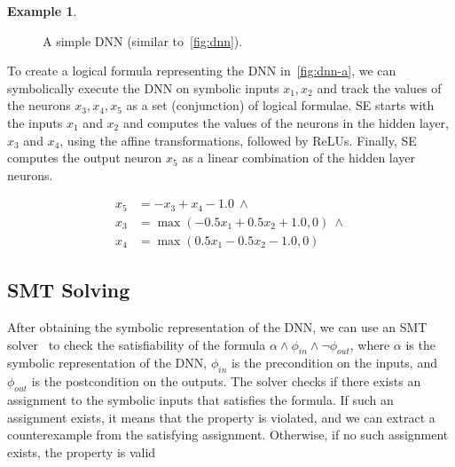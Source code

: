 \documentclass[oneside,11pt,dvipsnames]{book}
\numberwithin{equation}{section}
\theoremstyle{definition}
\newtheorem{example}{Example}[section]
\theoremstyle{remark}
\begin{document}
\begin{example}\label{ex:se-dnn}
\begin{figure}
\centering
{}
\caption{\label{fig:dnn-a}A simple DNN (similar to~\autoref{fig:dnn}).}
\end{figure}    

To create a logical formula representing the DNN in~\autoref{fig:dnn-a}, we can symbolically execute the DNN on symbolic inputs $x_1,x_2$ and track the values of the neurons $x_3, x_4, x_5$ as a set (conjunction) of logical formulae.  SE starts with the inputs $x_1$ and $x_2$ and computes the values of the neurons in the hidden layer, $x_3$ and $x_4$, using the affine transformations, followed by ReLUs. Finally, SE computes the output neuron $x_5$ as a linear combination of the hidden layer neurons.

\begin{equation}\label{eq:se-dnn}
    \begin{split}
x_5 &= -x_3 + x_4 - 1.0 ~\land \\
x_3 &= \max(-0.5x_1 + 0.5x_2 + 1.0, 0) ~\land \\
x_4 &= \max(0.5x_1 - 0.5x_2 - 1.0, 0)
    \end{split}
\end{equation}

\end{example}

\subsection{SMT Solving}\label{sec:smt}
After obtaining the symbolic representation of the DNN, we can use an SMT solver~\cite{barrett2010smt} to check the satisfiability of the formula $\alpha \land \phi_{in} \land \neg \phi_{out} $, where $\alpha$ is the symbolic representation of the DNN, $\phi_{in}$ is the precondition on the inputs, and $\phi_{out}$ is the postcondition on the outputs. The solver checks if there exists an assignment to the symbolic inputs that satisfies the formula. If such an assignment exists, it means that the property is violated, and we can extract a counterexample from the satisfying assignment. Otherwise, if no such assignment exists, the property is valid
\end{document}
